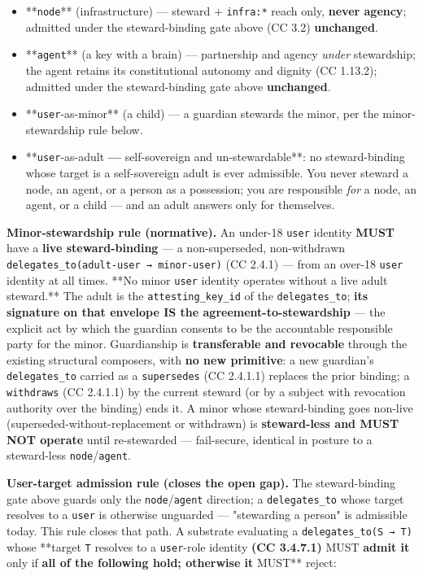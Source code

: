 \documentclass[11pt]{article}
\begin{document}
\begin{itemize}\setlength\itemsep{0pt}
\item **\texttt{node}** (infrastructure) — steward + \texttt{infra:*} reach only, \textbf{never agency}; admitted under the steward-binding gate above (CC 3.2) \textbf{unchanged}.
\item **\texttt{agent}** (a key with a brain) — partnership and agency \textit{under} stewardship; the agent retains its constitutional autonomy and dignity (CC 1.13.2); admitted under the steward-binding gate above \textbf{unchanged}.
\item **\texttt{user}-as-minor** (a child) — a guardian stewards the minor, per the minor-stewardship rule below.
\item **\texttt{user}-as-adult\textbf{ — }self-sovereign and un-stewardable**: no steward-binding whose target is a self-sovereign adult is ever admissible. You never steward a node, an agent, or a person as a possession; you are responsible \textit{for} a node, an agent, or a child — and an adult answers only for themselves.
\end{itemize}


\textbf{Minor-stewardship rule (normative).} An under-18 \texttt{user} identity \textbf{MUST} have a \textbf{live steward-binding} — a non-superseded, non-withdrawn \texttt{delegates\_to(adult-user → minor-user)} (CC 2.4.1) — from an over-18 \texttt{user} identity at all times. **No minor \texttt{user} identity operates without a live adult steward.** The adult is the \texttt{attesting\_key\_id} of the \texttt{delegates\_to}; \textbf{its signature on that envelope IS the agreement-to-stewardship} — the explicit act by which the guardian consents to be the accountable responsible party for the minor. Guardianship is \textbf{transferable and revocable} through the existing structural composers, with \textbf{no new primitive}: a new guardian's \texttt{delegates\_to} carried as a \texttt{supersedes} (CC 2.4.1.1) replaces the prior binding; a \texttt{withdraws} (CC 2.4.1.1) by the current steward (or by a subject with revocation authority over the binding) ends it. A minor whose steward-binding goes non-live (superseded-without-replacement or withdrawn) is \textbf{steward-less and MUST NOT operate} until re-stewarded — fail-secure, identical in posture to a steward-less \texttt{node}/\texttt{agent}.


\textbf{User-target admission rule (closes the open gap).} The steward-binding gate above guards only the \texttt{node}/\texttt{agent} direction; a \texttt{delegates\_to} whose target resolves to a \texttt{user} is otherwise unguarded — "stewarding a person" is admissible today. This rule closes that path. A substrate evaluating a \texttt{delegates\_to(S → T)} whose **target \texttt{T} resolves to a \texttt{user}-role identity\textbf{ (CC 3.4.7.1) }MUST\textbf{ admit it }only if\textbf{ all of the following hold; otherwise it }MUST** reject:
\end{document}
